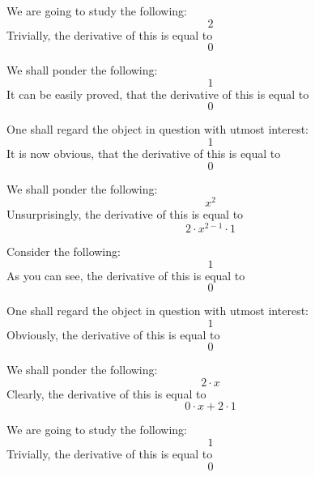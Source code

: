 \documentclass{article}
\begin{document}
We are going to study the following:
\begin{equation}
2 
\end{equation}
Trivially, the derivative of this is equal to
\begin{equation}
0 
\end{equation}

We shall ponder the following:
\begin{equation}
1 
\end{equation}
It can be easily proved, that the derivative of this is equal to
\begin{equation}
0 
\end{equation}

One shall regard the object in question with utmost interest:
\begin{equation}
1 
\end{equation}
It is now obvious, that the derivative of this is equal to
\begin{equation}
0 
\end{equation}

We shall ponder the following:
\begin{equation}
x ^{2 } 
\end{equation}
Unsurprisingly, the derivative of this is equal to
\begin{equation}
2 \cdot x ^{2 - 1 } \cdot 1 
\end{equation}

Consider the following:
\begin{equation}
1 
\end{equation}
As you can see, the derivative of this is equal to
\begin{equation}
0 
\end{equation}

One shall regard the object in question with utmost interest:
\begin{equation}
1 
\end{equation}
Obviously, the derivative of this is equal to
\begin{equation}
0 
\end{equation}

We shall ponder the following:
\begin{equation}
2 \cdot x 
\end{equation}
Clearly, the derivative of this is equal to
\begin{equation}
0 \cdot x + 2 \cdot 1 
\end{equation}

We are going to study the following:
\begin{equation}
1 
\end{equation}
Trivially, the derivative of this is equal to
\begin{equation}
0 
\end{equation}
\end{document}
